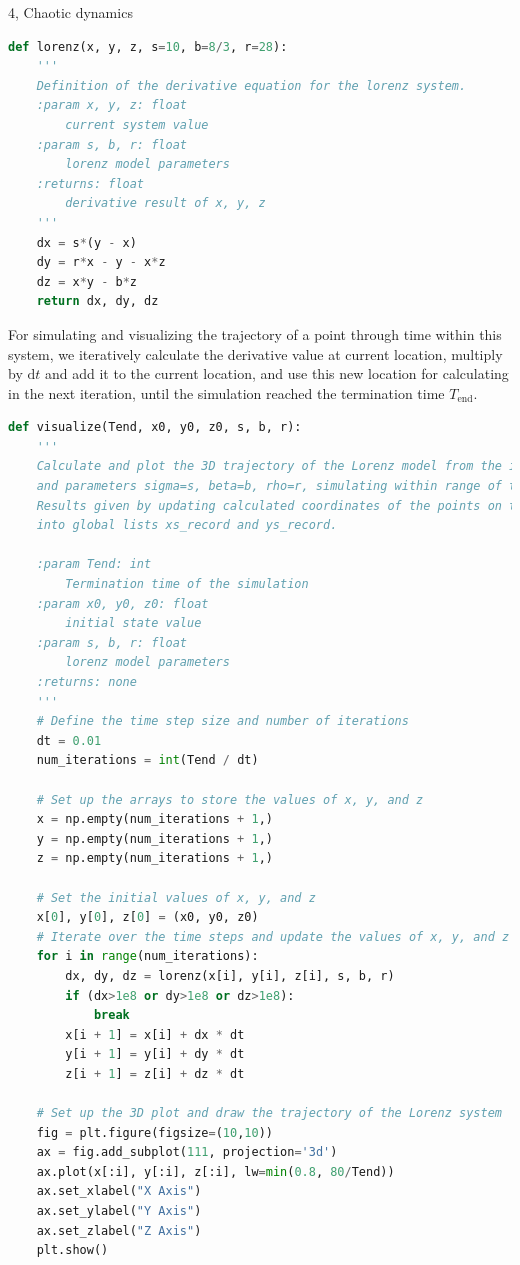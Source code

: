 \documentclass[10pt,a4paper]{article}
\begin{document}
\begin{task}{4, Chaotic dynamics}
\begin{lstlisting}[language = Python,  label = {cusp_method}]
def lorenz(x, y, z, s=10, b=8/3, r=28):
    ''' 
    Definition of the derivative equation for the lorenz system.
    :param x, y, z: float
        current system value
    :param s, b, r: float
        lorenz model parameters
    :returns: float
        derivative result of x, y, z
    '''
    dx = s*(y - x)
    dy = r*x - y - x*z
    dz = x*y - b*z
    return dx, dy, dz
\end{lstlisting}

For simulating and visualizing the trajectory of a point through time within this system, we iteratively calculate the derivative value at current location, multiply by $\text{d}t$ and add it to the current location, and use this new location for calculating in the next iteration, until the simulation reached the termination time $T_\text{end}$.

\begin{lstlisting}[language = Python,  label = {cusp_method}]
def visualize(Tend, x0, y0, z0, s, b, r):   
    '''
    Calculate and plot the 3D trajectory of the Lorenz model from the initial state x_0=(x0, y0, z0), 
    and parameters sigma=s, beta=b, rho=r, simulating within range of time from 0 to Tend.
    Results given by updating calculated coordinates of the points on the bifurcation plot
    into global lists xs_record and ys_record.

    :param Tend: int
        Termination time of the simulation 
    :param x0, y0, z0: float
        initial state value
    :param s, b, r: float
        lorenz model parameters
    :returns: none
    '''
    # Define the time step size and number of iterations
    dt = 0.01
    num_iterations = int(Tend / dt)

    # Set up the arrays to store the values of x, y, and z
    x = np.empty(num_iterations + 1,)
    y = np.empty(num_iterations + 1,)
    z = np.empty(num_iterations + 1,)

    # Set the initial values of x, y, and z
    x[0], y[0], z[0] = (x0, y0, z0)
    # Iterate over the time steps and update the values of x, y, and z using the Lorenz system equations
    for i in range(num_iterations):
        dx, dy, dz = lorenz(x[i], y[i], z[i], s, b, r)
        if (dx>1e8 or dy>1e8 or dz>1e8):
            break
        x[i + 1] = x[i] + dx * dt
        y[i + 1] = y[i] + dy * dt
        z[i + 1] = z[i] + dz * dt

    # Set up the 3D plot and draw the trajectory of the Lorenz system
    fig = plt.figure(figsize=(10,10))
    ax = fig.add_subplot(111, projection='3d')
    ax.plot(x[:i], y[:i], z[:i], lw=min(0.8, 80/Tend))
    ax.set_xlabel("X Axis")
    ax.set_ylabel("Y Axis")
    ax.set_zlabel("Z Axis")
    plt.show()
\end{lstlisting}


\end{task}
\end{document}
